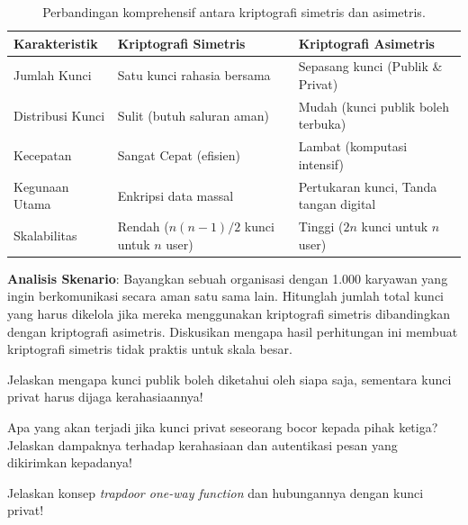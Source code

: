 \begin{table}[htbp]
  \centering
  \small
  \begin{tabular}{lll}
    \toprule
    \textbf{Karakteristik} & \textbf{Kriptografi Simetris} & \textbf{Kriptografi Asimetris} \\
    \midrule
    Jumlah Kunci & Satu kunci rahasia bersama & Sepasang kunci (Publik \& Privat) \\
    Distribusi Kunci & Sulit (butuh saluran aman) & Mudah (kunci publik boleh terbuka) \\
    Kecepatan & Sangat Cepat (efisien) & Lambat (komputasi intensif) \\
    Kegunaan Utama & Enkripsi data massal & Pertukaran kunci, Tanda tangan digital \\
    Skalabilitas & Rendah ($n(n-1)/2$ kunci untuk $n$ user) & Tinggi ($2n$ kunci untuk $n$ user) \\
    \bottomrule
  \end{tabular}
  \caption{Perbandingan komprehensif antara kriptografi simetris dan asimetris.}
  \label{tab:simetris-vs-asimetris}
\end{table}

\begin{aktivitas}
  \item \textbf{Analisis Skenario}: Bayangkan sebuah organisasi dengan 1.000 karyawan yang ingin berkomunikasi secara aman satu sama lain. Hitunglah jumlah total kunci yang harus dikelola jika mereka menggunakan kriptografi simetris dibandingkan dengan kriptografi asimetris. Diskusikan mengapa hasil perhitungan ini membuat kriptografi simetris tidak praktis untuk skala besar.
\end{aktivitas}

\begin{latihan}
  \item Jelaskan mengapa kunci publik boleh diketahui oleh siapa saja, sementara kunci privat harus dijaga kerahasiaannya!
  \item Apa yang akan terjadi jika kunci privat seseorang bocor kepada pihak ketiga? Jelaskan dampaknya terhadap kerahasiaan dan autentikasi pesan yang dikirimkan kepadanya!
  \item Jelaskan konsep \textit{trapdoor one-way function} dan hubungannya dengan kunci privat!
\end{latihan}
